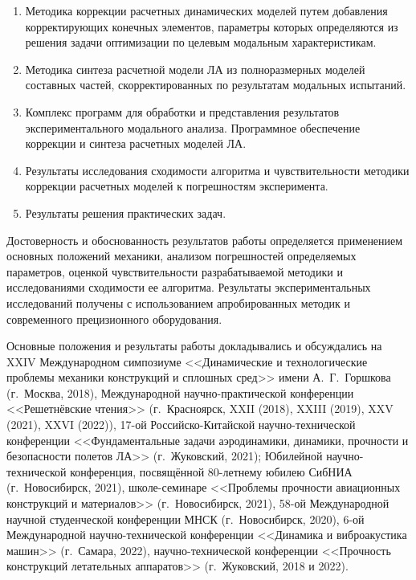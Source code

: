 {}
\begin{enumerate}[beginpenalty = 10000] 
	\item Методика коррекции расчетных динамических моделей путем добавления корректирующих конечных элементов, параметры которых определяются из решения задачи оптимизации по целевым модальным характеристикам.
	\item Методика синтеза расчетной модели ЛА из полноразмерных моделей составных частей, скорректированных по результатам модальных испытаний.
	\item Комплекс программ для обработки и представления результатов экспериментального модального анализа. Программное обеспечение коррекции и синтеза расчетных моделей ЛА.
	\item Результаты исследования сходимости алгоритма и чувствительности методики коррекции расчетных моделей к погрешностям эксперимента.
	\item Результаты решения практических задач.
\end{enumerate}

{\reliability} 

Достоверность и обоснованность результатов работы определяется применением основных положений механики, анализом погрешностей определяемых параметров, оценкой чувствительности разрабатываемой методики и исследованиями сходимости ее алгоритма. Результаты экспериментальных исследований получены с использованием апробированных методик и современного прецизионного оборудования.

Основные положения и результаты работы докладывались и обсуждались на XXIV Международном симпозиуме <<Динамические и технологические проблемы механики конструкций и сплошных сред>> имени А.~Г.~Горшкова (г.~Москва, 2018), Международной научно-практической конференции <<Решетнёвские чтения>> (г.~Красноярск, XXII (2018), XXIII (2019), XXV (2021), XXVI (2022)), 17-ой Российско-Китайской научно-технической конференции <<Фундаментальные задачи аэродинамики, динамики, прочности и безопасности полетов ЛА>> (г.~Жуковский, 2021); Юбилейной научно-технической конференция, посвящённой 80-летнему юбилею СибНИА (г.~Новосибирск, 2021), школе-семинаре <<Проблемы прочности авиационных конструкций и материалов>> (г.~Новосибирск, 2021), 58-ой Международной научной студенческой конференции МНСК (г.~Новосибирск, 2020), 6-ой Международной научно-технической конференции <<Динамика и виброакустика машин>> (г.~Самара, 2022), научно-технической конференции <<Прочность конструкций летательных аппаратов>> (г.~Жуковский, 2018 и 2022). 

